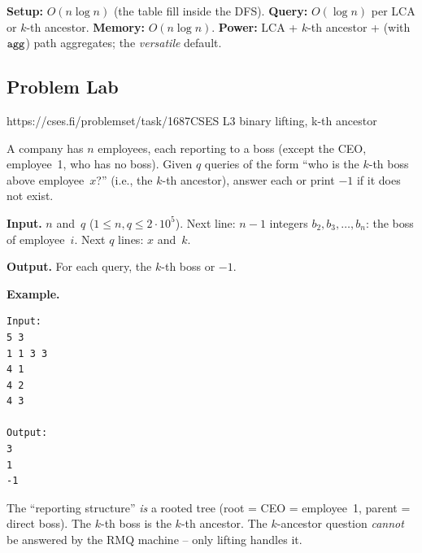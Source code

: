 \begin{complexitybox}
\textbf{Setup:} \(O(n\log n)\) (the table fill inside the DFS).
\textbf{Query:} \(O(\log n)\) per LCA or \(k\)-th ancestor.
\textbf{Memory:} \(O(n\log n)\).
\textbf{Power:} LCA + \(k\)-th ancestor + (with \(\texttt{agg}\)) path
aggregates; the \emph{versatile} default.
\end{complexitybox}

\subsection{Problem Lab}

  {https://cses.fi/problemset/task/1687}{CSES L3}
  {binary lifting, k-th ancestor}

\begin{problemstatement}
A company has \(n\) employees, each reporting to a boss (except the CEO,
employee~1, who has no boss).  Given \(q\) queries of the form ``who is
the \(k\)-th boss above employee~\(x\)?'' (i.e., the \(k\)-th ancestor),
answer each or print \(-1\) if it does not exist.

\textbf{Input.} \(n\) and~\(q\) ($1\le n,q\le 2\cdot10^5$).  Next line:
\(n-1\) integers \(b_2, b_3, \dots, b_n\): the boss of employee~\(i\).
Next \(q\) lines: \(x\) and~\(k\).

\textbf{Output.} For each query, the \(k\)-th boss or \(-1\).

\textbf{Example.}
\begin{verbatim}
Input:
5 3
1 1 3 3
4 1
4 2
4 3

Output:
3
1
-1
\end{verbatim}
\end{problemstatement}

\begin{attemptgate}
\end{attemptgate}

The ``reporting structure'' \emph{is} a rooted tree (root = CEO = employee~1,
parent = direct boss).  The \(k\)-th boss is the \(k\)-th ancestor.  The
\(k\)-ancestor question \emph{cannot} be answered by the RMQ machine --
only lifting handles it.

